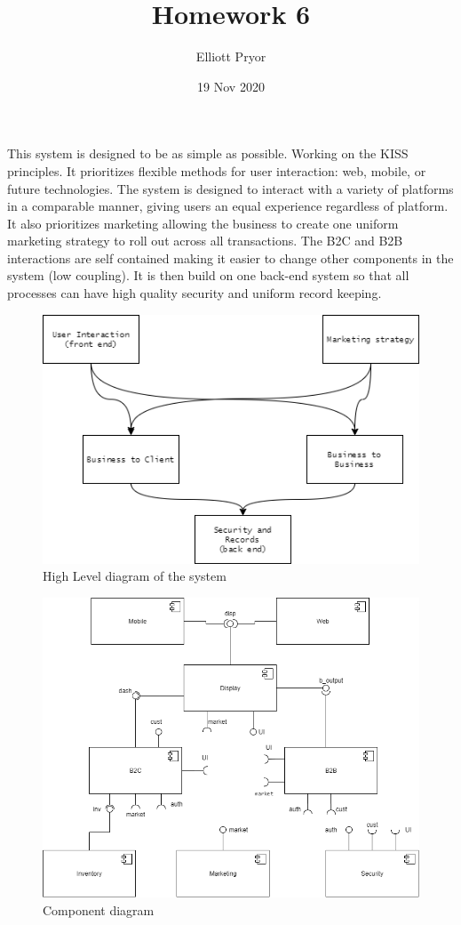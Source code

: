 \documentclass[11pt]{article}
\title{Homework 6}
\author{Elliott Pryor}
\date{19 Nov 2020}
\begin{document}
\maketitle


This system is designed to be as simple as possible. Working on the KISS principles. It prioritizes flexible methods for user interaction: web, mobile, or future technologies. 
The system is designed to interact with a variety of platforms in a comparable manner, giving users an equal experience regardless of platform.
It also prioritizes marketing allowing the business to create one uniform marketing strategy to roll out across all transactions.
The B2C and B2B interactions are self contained making it easier to change other components in the system (low coupling). 
It is then build on one back-end system so that all processes can have high quality security and uniform record keeping. 

\begin{figure}[H]
    \centering
    \includegraphics[scale = 0.7]{./p1_high_level.png}
    \caption{High Level diagram of the system}
    \label{fig:high level}
\end{figure}

\newpage
{}
\begin{figure}[H]
    \centering
    \includegraphics[width = \linewidth]{./p2_component.png}
    \caption{Component diagram}
    \label{fig:component}
\end{figure}
\end{document}
